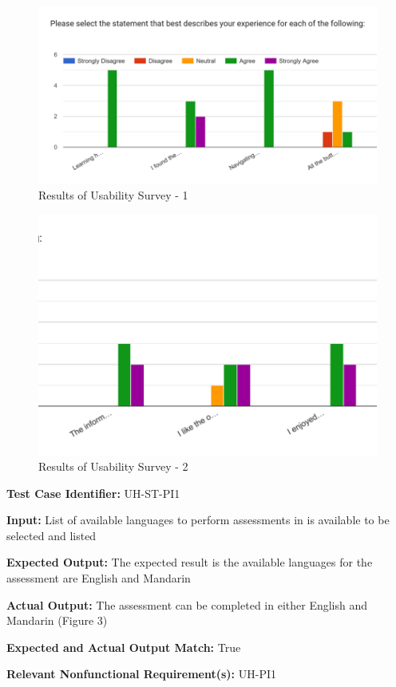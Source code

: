 \documentclass[12pt, titlepage]{article}
\begin{document}
\begin{figure}[h]
  \centering
  \includegraphics[width=1\textwidth]{images/UsabilityTestResults_pt1.png}
  \caption{Results of Usability Survey - 1}
\end{figure}

\begin{figure}[h]
  \centering
  \includegraphics[width=1\textwidth]{images/UsabilityTestResults_pt2.png}
  \caption{Results of Usability Survey - 2}
\end{figure}

\newpage

\begin{mdframed}[linewidth=0.5mm] \par
  \textbf{Test Case Identifier:} UH-ST-PI1 \par
  \textbf{Input:} List of available languages to perform assessments in is available to be selected and listed \par
  \textbf{Expected Output:} The expected result is the available languages for the assessment are English and Mandarin  \par
  \textbf{Actual Output:} The assessment can be completed in either English and Mandarin (Figure 3)\par
  \textbf{Expected and Actual Output Match:} True \par
  \textbf{Relevant Nonfunctional Requirement(s):} UH-PI1
\end{mdframed}
\end{document}
